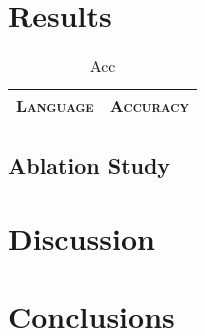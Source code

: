 \documentclass[11pt,a4paper]{article}
\begin{document}
\section{Results}

\begin{table}[h]	
\centering
\begin{tabular}{lc}
\textsc{Language} & \textsc{Accuracy} \\
  \hline
  
\end{tabular} 
\caption{Acc}
\label{tab:accuracy}
\end{table}



\subsection{Ablation Study}

\section{Discussion}

\section{Conclusions}







\end{document}
